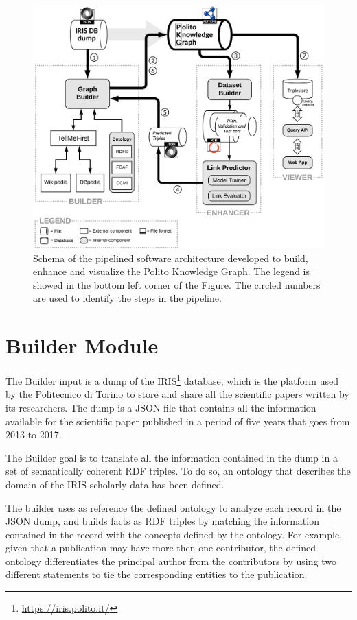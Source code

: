\documentclass[%
    corpo=13.5pt,
    twoside,
    oldstyle,
    tipotesi=magistrale,
    greek,
    evenboxes
]{toptesi}
\begin{document}
\begin{figure}[h]
    \centering
    \includegraphics[scale=0.8]{img/pipeline.png}
    \caption{Schema of the pipelined software architecture developed to build,
    enhance and visualize the Polito Knowledge Graph.
    The legend is showed in the bottom left corner of the Figure.
    The circled numbers are used to identify the steps in the pipeline.
    }
    \label{fig:pipeline}
\end{figure}

\newpage

\section{Builder Module}

The Builder input is a dump of the
IRIS\footnote{\url{https://iris.polito.it/}} database, which is the platform
used by the Politecnico di Torino to store and share all the
scientific papers written by its researchers. The dump is a
JSON file that contains all the information available for the scientific
paper published in a period of five years that goes from 2013 to 2017.

The Builder goal is to translate all the information contained in the
dump in a set of semantically coherent RDF triples. To do so, an ontology that
describes the domain of the IRIS scholarly data has been defined.

The builder uses as reference the defined ontology to analyze each record in
the JSON dump, and builds facts as RDF triples by matching the information
contained in the record with the concepts defined by the ontology.
For example, given that a publication may have more then one contributor, the
defined ontology differentiates the principal author from the
contributors by using two different statements to tie the corresponding entities
to the publication.
\end{document}
